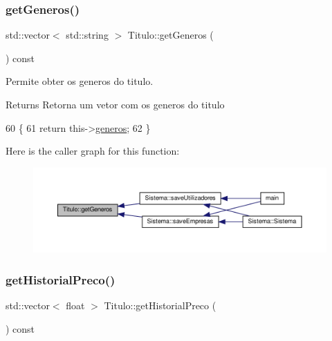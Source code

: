 \mbox{\label{classTitulo_a09992b973f8cfe755f21ff725b2970f0}} 
\subsubsection{\texorpdfstring{get\+Generos()}{getGeneros()}}
{\footnotesize\ttfamily std\+::vector$<$ std\+::string $>$ Titulo\+::get\+Generos (\begin{DoxyParamCaption}{ }\end{DoxyParamCaption}) const}



Permite obter os generos do titulo. 

\begin{DoxyReturn}{Returns}
Retorna um vetor com os generos do titulo 
\end{DoxyReturn}

\begin{DoxyCode}
60                                                \{
61         \textcolor{keywordflow}{return} this->\hyperlink{classTitulo_a3209265c8534416978ee9891b96c14b2}{generos};
62 \}
\end{DoxyCode}
Here is the caller graph for this function\+:
\nopagebreak
\begin{figure}[H]
\begin{center}
\leavevmode
\includegraphics[width=350pt]{classTitulo_a09992b973f8cfe755f21ff725b2970f0_icgraph}
\end{center}
\end{figure}
\mbox{\label{classTitulo_ab392d79a55b0ce556e03ad5a2fecad05}} 
\subsubsection{\texorpdfstring{get\+Historial\+Preco()}{getHistorialPreco()}}
{\footnotesize\ttfamily std\+::vector$<$ float $>$ Titulo\+::get\+Historial\+Preco (\begin{DoxyParamCaption}{ }\end{DoxyParamCaption}) const}




